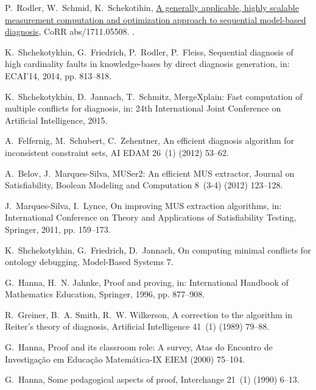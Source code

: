 \documentclass[]{elsarticle}
\begin{document}
\begin{thebibliography}{10}
		P.~Rodler, W.~Schmid, K.~Schekotihin, \href{http://arxiv.org/abs/1711.05508}{A
			generally applicable, highly scalable measurement computation and
			optimization approach to sequential model-based diagnosis}, CoRR
		abs/1711.05508.
		\newblock \href {http://arxiv.org/abs/1711.05508} {}.
		
		K.~Shchekotykhin, G.~Friedrich, P.~Rodler, P.~Fleiss, {Sequential diagnosis of
			high cardinality faults in knowledge-bases by direct diagnosis generation},
		in: ECAI'14, 2014, pp. 813--818.
		
		K.~Shchekotykhin, D.~Jannach, T.~Schmitz, {MergeXplain: Fast computation of
			multiple conflicts for diagnosis}, in: 24th International Joint
		Conference on Artificial Intelligence, 2015.
		
		A.~Felfernig, M.~Schubert, C.~Zehentner, An efficient diagnosis algorithm for
		inconsistent constraint sets, AI EDAM 26~(1) (2012) 53--62.
		
		A.~Belov, J.~Marques-Silva, {MUSer2: An efficient MUS extractor}, Journal on
		Satisfiability, Boolean Modeling and Computation 8~(3-4) (2012) 123--128.
		
		J.~Marques-Silva, I.~Lynce, {On improving MUS extraction algorithms}, in:
		International Conference on Theory and Applications of Satisfiability
		Testing, Springer, 2011, pp. 159--173.
		
		K.~Shchekotykhin, G.~Friedrich, D.~Jannach, On computing minimal conflicts for
		ontology debugging, Model-Based Systems 7.
		
		G.~Hanna, H.~N. Jahnke, Proof and proving, in: International Handbook of
		Mathematics Education, Springer, 1996, pp. 877--908.
		
		R.~Greiner, B.~A. Smith, R.~W. Wilkerson, {A correction to the algorithm in
			Reiter's theory of diagnosis}, Artificial Intelligence 41~(1) (1989) 79--88.
		
		G.~Hanna, Proof and its classroom role: A survey, Atas do Encontro de
		Investiga{\c{c}}{\~a}o em Educa{\c{c}}{\~a}o Matem{\'a}tica-IX EIEM (2000)
		75--104.
		
		G.~Hanna, Some pedagogical aspects of proof, Interchange 21~(1) (1990) 6--13.
		
	\end{thebibliography}
	
	
	
	
\end{document}

